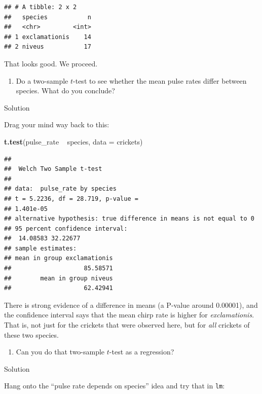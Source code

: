 \documentclass[]{tufte-book}
\newenvironment{Shaded}{}{}
\newcommand{\DataTypeTok}[1]{\textcolor[rgb]{0.56,0.13,0.00}{#1}}
\newcommand{\KeywordTok}[1]{\textcolor[rgb]{0.00,0.44,0.13}{\textbf{#1}}}
\newcommand{\NormalTok}[1]{#1}
\newcommand{\OperatorTok}[1]{\textcolor[rgb]{0.40,0.40,0.40}{#1}}
\newcommand{\StringTok}[1]{\textcolor[rgb]{0.25,0.44,0.63}{#1}}
\providecommand{\tightlist}{%
  \setlength{\itemsep}{0pt}\setlength{\parskip}{0pt}}
\theoremstyle{definition}
\theoremstyle{definition}
\theoremstyle{definition}
\theoremstyle{remark}
\begin{document}
\begin{verbatim}
## # A tibble: 2 x 2
##   species           n
##   <chr>         <int>
## 1 exclamationis    14
## 2 niveus           17
\end{verbatim}

That looks good. We proceed.

\begin{enumerate}
\def\labelenumi{(\alph{enumi})}
\setcounter{enumi}{1}
\tightlist
\item
  Do a two-sample \(t\)-test to see whether the mean pulse rates differ
  between species. What do you conclude?
\end{enumerate}

Solution

Drag your mind way back to this:

\begin{Shaded}
\begin{Highlighting}[]
\KeywordTok{t.test}\NormalTok{(pulse_rate }\OperatorTok{~}\StringTok{ }\NormalTok{species, }\DataTypeTok{data =}\NormalTok{ crickets)}
\end{Highlighting}
\end{Shaded}

\begin{verbatim}
## 
##  Welch Two Sample t-test
## 
## data:  pulse_rate by species
## t = 5.2236, df = 28.719, p-value =
## 1.401e-05
## alternative hypothesis: true difference in means is not equal to 0
## 95 percent confidence interval:
##  14.08583 32.22677
## sample estimates:
## mean in group exclamationis 
##                    85.58571 
##        mean in group niveus 
##                    62.42941
\end{verbatim}

There is strong evidence of a difference in means (a P-value around
0.00001), and the confidence interval says that the mean chirp rate is
higher for \emph{exclamationis}. That is, not just for the crickets that
were observed here, but for \emph{all} crickets of these two species.

\begin{enumerate}
\def\labelenumi{(\alph{enumi})}
\setcounter{enumi}{2}
\tightlist
\item
  Can you do that two-sample \(t\)-test as a regression?
\end{enumerate}

Solution

Hang onto the ``pulse rate depends on species'' idea and try that in
\texttt{lm}:
\end{document}
